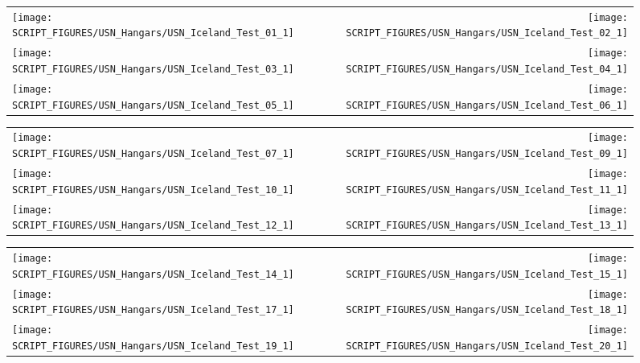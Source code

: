 \begin{figure}[h!]
\begin{tabular*}{\textwidth}{l@{\extracolsep{\fill}}r}
\texttt{[image: SCRIPT\_FIGURES/USN\_Hangars/USN\_Iceland\_Test\_01\_1]} &
\texttt{[image: SCRIPT\_FIGURES/USN\_Hangars/USN\_Iceland\_Test\_02\_1]} \\
\texttt{[image: SCRIPT\_FIGURES/USN\_Hangars/USN\_Iceland\_Test\_03\_1]} &
\texttt{[image: SCRIPT\_FIGURES/USN\_Hangars/USN\_Iceland\_Test\_04\_1]} \\
\texttt{[image: SCRIPT\_FIGURES/USN\_Hangars/USN\_Iceland\_Test\_05\_1]} &
\texttt{[image: SCRIPT\_FIGURES/USN\_Hangars/USN\_Iceland\_Test\_06\_1]} \\
\end{tabular*}
\label{USN_Plume_Iceland_1}
\end{figure}

\newpage

\begin{figure}[p]
\begin{tabular*}{\textwidth}{l@{\extracolsep{\fill}}r}
\texttt{[image: SCRIPT\_FIGURES/USN\_Hangars/USN\_Iceland\_Test\_07\_1]} &
\texttt{[image: SCRIPT\_FIGURES/USN\_Hangars/USN\_Iceland\_Test\_09\_1]} \\
\texttt{[image: SCRIPT\_FIGURES/USN\_Hangars/USN\_Iceland\_Test\_10\_1]} &
\texttt{[image: SCRIPT\_FIGURES/USN\_Hangars/USN\_Iceland\_Test\_11\_1]} \\
\texttt{[image: SCRIPT\_FIGURES/USN\_Hangars/USN\_Iceland\_Test\_12\_1]} &
\texttt{[image: SCRIPT\_FIGURES/USN\_Hangars/USN\_Iceland\_Test\_13\_1]} \\
\end{tabular*}
\label{USN_Plume_Iceland_2}
\end{figure}

\begin{figure}[p]
\begin{tabular*}{\textwidth}{l@{\extracolsep{\fill}}r}
\texttt{[image: SCRIPT\_FIGURES/USN\_Hangars/USN\_Iceland\_Test\_14\_1]} &
\texttt{[image: SCRIPT\_FIGURES/USN\_Hangars/USN\_Iceland\_Test\_15\_1]} \\
\texttt{[image: SCRIPT\_FIGURES/USN\_Hangars/USN\_Iceland\_Test\_17\_1]} &
\texttt{[image: SCRIPT\_FIGURES/USN\_Hangars/USN\_Iceland\_Test\_18\_1]} \\
\texttt{[image: SCRIPT\_FIGURES/USN\_Hangars/USN\_Iceland\_Test\_19\_1]} &
\texttt{[image: SCRIPT\_FIGURES/USN\_Hangars/USN\_Iceland\_Test\_20\_1]} \\
\end{tabular*}
\label{USN_Plume_Iceland_3}
\end{figure}

